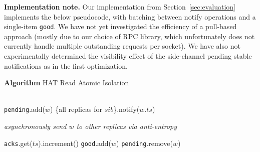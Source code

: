 \vspace{1em}\noindent\textbf{Implementation note.} Our implementation from Section~\ref{sec:evaluation} implements the below pseudocode, with batching between \textrm{notify} operations and a single-item \texttt{good}. We have not yet investigated the efficiency of a pull-based approach (mostly due to our choice of RPC library, which unfortunately does not currently handle multiple outstanding requests per socket). We have also not experimentally determined the visibility effect of the side-channel pending stable notifications as in the first optimization.

\begin{algorithm}[t!]
\newcommand{\myindent}{\hspace{-1em}}
\begin{addmargin}[-1em]{0em}%

\begin{algorithmic}
\caption*{\textbf{Algorithm} HAT Read Atomic Isolation}\vspace{.5em}
\vspace{.5em}

  \\

  \State \texttt{pending}.add($w$)
  \State \{all replicas for $sib$\}.notify($w.ts$)
  \EndFor
  
  \State \textit{asynchronously send $w$ to other replicas via anti-entropy}
  \State \Return

  \EndProcedure\vspace{.5em}

  \State \texttt{acks}.get($ts$).increment()
  \State \texttt{good}.add($w$)
  \State \texttt{pending}.remove($w$)  
  \EndIf  
  \EndProcedure\vspace{.5em}


\end{algorithmic}
\end{addmargin}
\end{algorithm}

